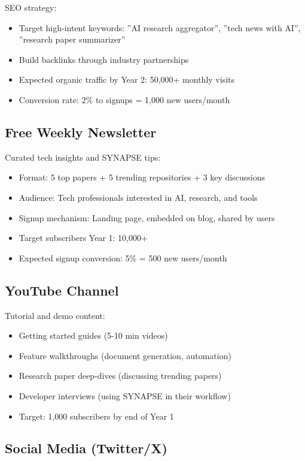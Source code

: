 \documentclass{report}
\begin{document}
SEO strategy:
\begin{itemize}
    \item Target high-intent keywords: ''AI research aggregator'', ''tech news with AI'', ''research paper summarizer''
    \item Build backlinks through industry partnerships
    \item Expected organic traffic by Year 2: 50,000+ monthly visits
    \item Conversion rate: 2\% to signups = 1,000 new users/month
\end{itemize}

\subsection{Free Weekly Newsletter}

Curated tech insights and SYNAPSE tips:

\begin{itemize}
    \item Format: 5 top papers + 5 trending repositories + 3 key discussions
    \item Audience: Tech professionals interested in AI, research, and tools
    \item Signup mechanism: Landing page, embedded on blog, shared by users
    \item Target subscribers Year 1: 10,000+
    \item Expected signup conversion: 5\% = 500 new users/month
\end{itemize}

\subsection{YouTube Channel}

Tutorial and demo content:

\begin{itemize}
    \item Getting started guides (5-10 min videos)
    \item Feature walkthroughs (document generation, automation)
    \item Research paper deep-dives (discussing trending papers)
    \item Developer interviews (using SYNAPSE in their workflow)
    \item Target: 1,000 subscribers by end of Year 1
\end{itemize}

\subsection{Social Media (Twitter/X)}
\end{document}
